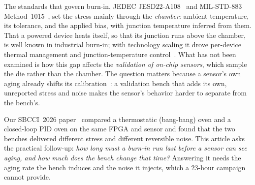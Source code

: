 \documentclass[10pt,twocolumn]{article}
\begin{document}
The standards that govern burn-in, JEDEC JESD22-A108~\cite{jedec} and MIL-STD-883 Method~1015~\cite{mil}, set the stress mainly through the \emph{chamber}: ambient temperature, its tolerance, and the applied bias, with junction temperature inferred from them. That a powered device heats itself, so that its junction runs above the chamber, is well known in industrial burn-in; with technology scaling it drove per-device thermal management and junction-temperature control~\cite{vassighi,semenov}. What has not been examined is how this gap affects the \emph{validation of on-chip sensors}, which sample the die rather than the chamber. The question matters because a sensor's own aging already shifts its calibration~\cite{anik}: a validation bench that adds its own, unreported stress and noise makes the sensor's behavior harder to separate from the bench's.

Our SBCCI~2026 paper~\cite{sbcci26} compared a thermostatic (bang-bang) oven and a closed-loop PID oven on the same FPGA and sensor and found that the two benches delivered different stress and different reversible noise. This article asks the practical follow-up: \emph{how long must a burn-in run last before a sensor can see aging, and how much does the bench change that time?} Answering it needs the aging rate the bench induces and the noise it injects, which a 23-hour campaign cannot provide.
\end{document}

